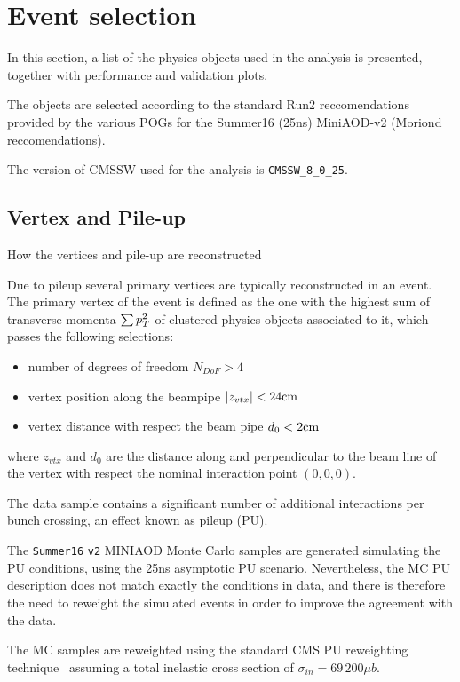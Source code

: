 \section{Event selection}
\label{sec:objects}

In this section, a list of the physics objects used in the analysis is presented, together with performance and validation plots. 

The objects are selected according to the standard Run2 reccomendations provided by the various POGs for the Summer16 (25ns) MiniAOD-v2 (Moriond reccomendations).

The version of CMSSW used for the analysis is {\tt CMSSW\_8\_0\_25}.

\subsection{Vertex and Pile-up}
{\color{red} How the vertices and pile-up are reconstructed}

Due to pileup several primary vertices are typically reconstructed in an event.
The primary vertex of the event is defined as the one with the highest sum of transverse momenta $\sum p_T^2$ of clustered physics objects associated to it, which passes the following selections:
\begin{itemize}
  \item number of degrees of freedom $N_{DoF}>4$
  \item vertex position along the beampipe $|z_{vtx}|<24\text{cm}$
  \item vertex distance with respect the beam pipe $d_0<2\text{cm}$
\end{itemize}
where $z_{vtx}$ and $d_0$ are the distance along and perpendicular to the beam line of the vertex with respect the nominal interaction point $(0,0,0)$.

The data sample contains a significant number of additional interactions per bunch crossing, an effect known as pileup (PU). 

The {\tt Summer16} \texttt{v2} MINIAOD Monte Carlo samples are generated simulating the PU conditions, using the 25ns asymptotic PU scenario. 
Nevertheless, the MC PU description does not match exactly the conditions in data, and there is therefore the need to reweight the simulated events in order to improve the agreement with the data. 

The MC samples are reweighted using the standard CMS PU reweighting technique~\cite{bib:pureweight,bib:pureweight2} assuming a total inelastic cross section of $\sigma_{in} = 69\,200 \mu b$.

